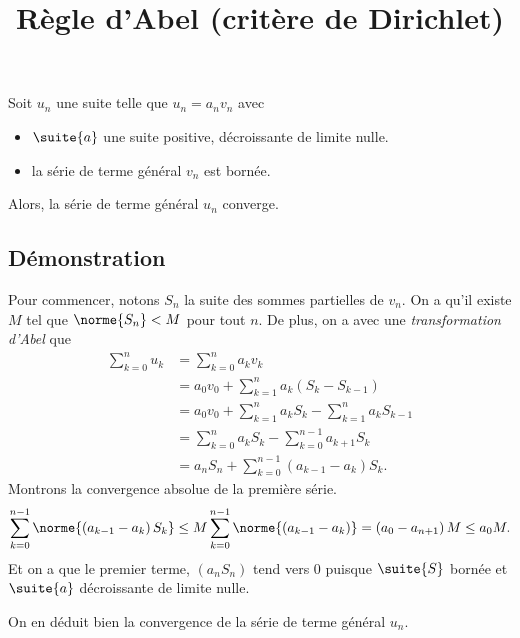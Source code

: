 \documentclass[fontsize=12pt,twoside=false,parskip=half, french]{scrartcl}
\title{Règle d'Abel (critère de Dirichlet)}
\date{}
\author{}
\begin{document}
\maketitle 
   \begin{Theoreme}
      Soit $u_n$ une suite telle que $u_n = a_n v_n$ avec 
         \begin{itemize}
            \item $\suite{a}$ une suite positive, décroissante de limite nulle.
            \item la série de terme général $v_n$ est bornée.
         \end{itemize}
      Alors, la série de terme général $u_n$ converge.
   \end{Theoreme}
   \subsection{Démonstration}
      Pour commencer, notons $S_n$ la suite des sommes partielles de $v_n$. On a
      qu’il existe $M$ tel que $\norme{S_n} < M$ pour tout $n$. De plus, on a 
      avec une \emph{transformation d’Abel} que
      \begin{align*}
         \sum_{k = 0}^n u_k &= \sum_{k = 0}^n a_kv_k\\
                            &= a_0 v_0 + \sum_{k = 1}^n a_k\left(S_k - S_{k - 1}\right)\\
                            &= a_0 v_0 + \sum_{k = 1}^n a_k S_k - \sum_{k = 1}^n a_k S_{k - 1}\\
                            &= \sum_{k = 0}^n a_k S_k - \sum_{k = 0}^{n - 1} a_{k + 1} S_k\\
                            &= a_nS_n + \sum_{k = 0}^{n - 1} \left(a_{k - 1} - a_k\right) S_k.
      \end{align*}
      Montrons la convergence absolue de la première série. 
      \[
         \sum_{k = 0}^{n - 1} \norme{\left(a_{k - 1} - a_k\right) S_k} 
               \leq M \sum_{k = 0}^{n - 1} \norme{\left(a_{k - 1} - a_k\right)} = \left(a_0 - a_{n + 1}\right)M \leq a_0M.
      \]
      Et on a que le premier terme, $\left(a_nS_n\right)$ tend vers $0$ puisque 
      $\suite{S}$ bornée et $\suite{a}$ décroissante de limite nulle.
      
      On en déduit bien la convergence de la série de terme général $u_n$.
\end{document}
